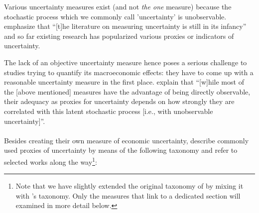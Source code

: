 \documentclass[a4paper,11pt,listof=nochaptergap,oneside,pointednumbers,bibtotoc,bigheadings,liststotoc]{scrbook}
\theoremstyle{mysatz}
\theoremstyle{mydefinition}
\theoremstyle{mybemerkung}
\begin{document}
Various uncertainty measures exist (and not \textit{the one} measure) because the stochastic process which we commonly call 'uncertainty' is unobservable. \citet[p. 1182]{juradoetal:15} emphasize that ``[t]he literature on measuring uncertainty is still in its infancy'' and so far existing research has popularized various proxies or indicators of uncertainty.

The lack of an objective uncertainty measure hence poses a serious challenge to studies trying to quantify its macroeconomic effects: they have to come up with a reasonable uncertainty measure in the first place. \citet[p. 1178]{juradoetal:15} explain that ``[w]hile most of the [above mentioned] measures have the advantage of being directly observable, their adequacy as proxies for uncertainty depends on how strongly they are correlated with this latent stochastic process [i.e., with unobservable uncertainty]''.\\
\\ 
Besides creating their own measure of economic uncertainty, \citet{orlikandveldkamp:14} describe commonly used proxies of uncertainty by means of the following taxonomy and refer to selected works along the way\footnote{Note that we have slightly extended the original taxonomy of \citet{orlikandveldkamp:14} by mixing it with \citet{bontempietal:16}'s taxonomy. Only the measures that link to a dedicated section will examined in more detail below.}:
\end{document}

